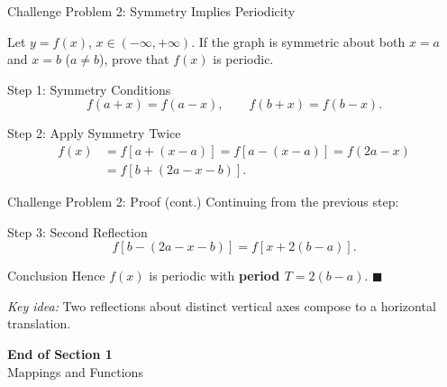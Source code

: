 \documentclass[aspectratio=169,10pt]{beamer}
\begin{document}
\begin{frame}{Challenge Problem 2: Symmetry Implies Periodicity}
  \begin{example}
    Let $y=f(x)$, $x\in(-\infty,+\infty)$.
    If the graph is symmetric about both $x=a$ and $x=b$ ($a\neq b$),
    prove that $f(x)$ is periodic.
  \end{example}
  \pause
  \begin{block}{Step 1: Symmetry Conditions}
    \[
      f(a+x)=f(a-x),\qquad f(b+x)=f(b-x).
    \]
  \end{block}
  \pause
  \begin{block}{Step 2: Apply Symmetry Twice}
    \begin{align*}
      f(x)&=f[a+(x-a)]=f[a-(x-a)]=f(2a-x)\\
          &=f[b+(2a-x-b)].
    \end{align*}
  \end{block}
\end{frame}

\begin{frame}{Challenge Problem 2: Proof (cont.)}
  Continuing from the previous step:
  \pause
  \begin{block}{Step 3: Second Reflection}
    \[
      f[b-(2a-x-b)] = f[x+2(b-a)].
    \]
  \end{block}
  \pause
  \begin{alertblock}{Conclusion}
    Hence $f(x)$ is periodic with \textbf{period $T=2(b-a)$}. \hfill$\blacksquare$
  \end{alertblock}
  \vfill
  \small
  \textit{Key idea:} Two reflections about distinct vertical axes compose to a horizontal translation.
\end{frame}

\begin{frame}
  \centering
  \vfill
  {\Large\bfseries End of Section 1}\\[8pt]
  {\normalsize Mappings and Functions}
  \vfill
\end{frame}
\end{document}
